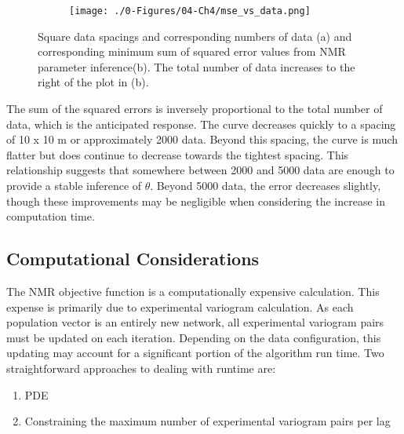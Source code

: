 \begin{figure}
    \begin{subtable}{.5\textwidth}
        \centering
        \resizebox{1\width}{!}{}
        \caption{}
        \label{tab:syn_data}
    \end{subtable}
    \begin{subfigure}{.5\textwidth}
        \centering
        \texttt{[image: ./0-Figures/04-Ch4/mse\_vs\_data.png]}
        \caption{}
        \label{fig:mse_vs_data_plot}
    \end{subfigure}
    \caption{Square data spacings and corresponding numbers of data (a) and corresponding minimum sum of squared error values from \gls{NMR} parameter inference(b). The total number of data increases to the right of the plot in (b). }
    \label{fig:mse_vs_data}
\end{figure}

The sum of the squared errors is inversely proportional to the total number of data, which is the anticipated response. The curve decreases quickly to a spacing of 10 x 10 m or approximately 2000 data. Beyond this spacing, the curve is much flatter but does continue to decrease towards the tightest spacing. This relationship suggests that somewhere between 2000 and 5000 data are enough to provide a stable inference of $\theta$. Beyond 5000 data, the error decreases slightly, though these improvements may be negligible when considering the increase in computation time.

\subsection{Computational Considerations}
\label{subsec:04comp}

The NMR objective function is a computationally expensive calculation. This expense is primarily due to experimental variogram calculation. As each population vector is an entirely new network, all experimental variogram pairs must be updated on each iteration. Depending on the data configuration, this updating may account for a significant portion of the algorithm run time. Two straightforward approaches to dealing with runtime are:
\begin{enumerate}
    \item \Gls{PDE}
    \item Constraining the maximum number of experimental variogram pairs per lag
\end{enumerate}

